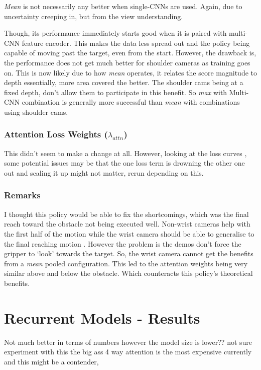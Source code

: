 \emph{Mean} is not necessarily any better when single-CNNs are used. Again, due to uncertainty creeping in, but from the view understanding.

Though, its performance immediately starts good when it is paired with multi-CNN feature encoder. This makes the data less spread out  and the policy being capable of moving past the target, even from the start. However, the drawback is, the performance does not get much better for shoulder cameras as training goes on. This is now likely due to how \emph{mean} operates, it relates the score magnitude to depth essentially, more area covered the better. The shoulder cams being at a fixed depth, don't allow them to participate in this benefit. So \emph{max} with Multi-CNN combination is generally more successful than \emph{mean} with combinations using shoulder cams.

\subsubsection{Attention Loss Weights ($\lambda_{attn}$)}
This didn't seem to make a change at all. However, looking at the loss curves , some potential issues may be that the one loss term is drowning the other one out and scaling it up might not matter, rerun depending on this.


\subsubsection{Remarks}
I thought this policy would be able to fix the shortcomings, which was the final reach toward the obstacle not being executed well. Non-wrist cameras help with the first half of the motion while the wrist camera should be able to generalise to the final reaching motion . However the problem is the demos don't force the gripper to `look' towards the target. So, the wrist camera cannot get the benefits from a \emph{mean} pooled configuration. This led to the attention weights being very similar above and below the obstacle. Which counteracts this policy's theoretical benefits.


\section{Recurrent Models - Results}
Not much better in terms of numbers however the model size is lower?? not sure experiment with this the big ass 4 way attention is the most expensive currently and this might be a contender,